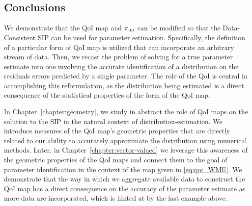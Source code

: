 

\FloatBarrier
\subsection{Conclusions}\label{sec:conclusions}
We demonstrate that the QoI map and $\operatorname*{\pi_{up}}$ can be modified so that the Data-Consistent SIP can be used for parameter estimation.
Specifically, the definition of a particular form of QoI map is utilized that can incorporate an arbitrary stream of data.
Then, we recast the problem of solving for a true parameter estimate into one involving the accurate identification of a distribution on the residuals errors predicted by a single parameter.
The role of the QoI is central in accomplishing this reformulation, as the distribution being estimated is a direct consequence of the statistical properties of the form of the QoI map.

In Chapter~\ref{chapter:geometry}, we study in abstract the role of QoI maps on the solution to the SIP in the natural context of distribution-estimation.
We introduce measures of the QoI map's geometric properties that are directly related to our ability to accurately approximate the distribution using numerical methods.
Later, in Chapter~\ref{chapter:vector-valued} we leverage this awareness of the geometric properties of the QoI maps and connect them to the goal of parameter identification in the context of the map given in \eqref{eq:qoi_WME}.
We demonstrate that the way in which we aggregate available data to construct the QoI map has a direct consequence on the accuracy of the parameter estimate as more data are incorporated, which is hinted at by the last example above.
